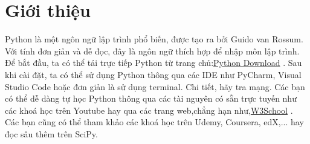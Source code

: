 \section*{Giới thiệu}
Python là một ngôn ngữ lập trình phổ biến, được tạo ra bởi Guido van Rossum. Với tính đơn giản và dễ đọc, đây là ngôn ngữ thích hợp để nhập môn lập trình. Để bắt đầu, ta có thể tải trực tiếp Python từ trang chủ:\href{https://www.python.org/downloads/}{Python Download} . Sau khi cài đặt, ta có thể sử dụng Python thông qua các IDE như PyCharm, Visual Studio Code hoặc đơn giản là sử dụng terminal. Chi tiết, hãy tra mạng.\newline
Các bạn có thể dễ dàng tự học Python thông qua các tài nguyên có sẵn trực tuyến như các khoá học trên Youtube hay qua các trang web,chẳng hạn như,\href{https://www.w3schools.com/python/python_intro.asp}{W3School} . Các bạn cũng có thể tham khảo các khoá học trên Udemy, Coursera, edX,... hay đọc sâu thêm trên SciPy.\newline  
